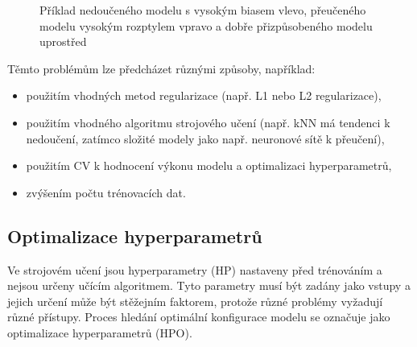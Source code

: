 \begin{figure}[!htb]
\begin{center}
        \caption{Příklad nedoučeného modelu s vysokým biasem vlevo, přeučeného
            modelu vysokým rozptylem vpravo a dobře přizpůsobeného modelu uprostřed~\cite{overunderfit}}
        \label{fig:overunderfit}
    \end{center}
\end{figure}

\noindent Těmto problémům lze předcházet různými způsoby, například:
\begin{itemize}
    \item použitím vhodných metod regularizace (např. L1 nebo L2 regularizace),
    \item použitím vhodného algoritmu strojového učení (např. kNN má tendenci k
          nedoučení, zatímco složité modely jako např. neuronové sítě k přeučení),
    \item použitím CV k hodnocení výkonu modelu a optimalizaci hyperparametrů,
    \item zvýšením počtu trénovacích dat.
\end{itemize}

\subsection{Optimalizace hyperparametrů}
\label{subsec:hyperparametry}
Ve strojovém učení jsou hyperparametry (HP) nastaveny před trénováním a nejsou
určeny učícím algoritmem. Tyto parametry musí být zadány jako vstupy a jejich
určení může být stěžejním faktorem, protože různé problémy vyžadují různé
přístupy. Proces hledání optimální konfigurace modelu se označuje jako
optimalizace hyperparametrů (HPO).


